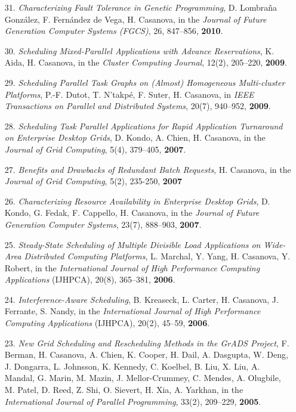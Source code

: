 \begin{enumerate}
\item[31.] {\it Characterizing Fault Tolerance in Genetic Programming}, D. Lombraña González, F. Fernández de Vega, H. Casanova, in the \emph{Journal of Future Generation Computer Systems (FGCS)}, 26, 847--856, {\bf 2010}.

\item[30.] {\it Scheduling Mixed-Parallel Applications with Advance
Reservations}, K. Aida, H. Casanova, in the \emph{Cluster Computing
Journal}, 12(2), 205--220, {\bf 2009}.

\item[29.] {\it Scheduling Parallel Task Graphs on (Almost) Homogeneous
Multi-cluster Platforms}, P.-F. Dutot, T. N'takp\'e, F. Suter, H. Casanova,
in \emph{IEEE Transactions on Parallel and Distributed Systems}, 20(7), 940--952, {\bf 2009}.

\item[28.] {\it Scheduling Task Parallel Applications for Rapid Application Turnaround on Enterprise Desktop Grids}, D. Kondo, A. Chien, H. Casanova,  in the \emph{Journal of Grid Computing}, 5(4), 379--405, {\bf 2007}.

\item[27.] {\it Benefits and Drawbacks of Redundant Batch Requests}, H. Casanova, in the \emph{Journal of Grid Computing}, 5(2), 235-250, {\bf 2007}

\item[26.] {\it Characterizing Resource Availability in Enterprise Desktop
Grids}, D. Kondo, G. Fedak, F. Cappello, H. Casanova, in the \emph{Journal
of Future Generation Computer Systems}, 23(7), 888--903, {\bf 2007}.

\item[25.] {\it Steady-State Scheduling of Multiple Divisible Load
Applications on Wide-Area Distributed Computing Platforms}, L. Marchal, Y.
Yang, H. Casanova, Y. Robert, in the \emph{International Journal
of High Performance Computing Applications} (IJHPCA), 20(8), 365--381,
{\bf 2006}.

\item [24.] {\it Interference-Aware Scheduling}, B. Kreaseck,
L. Carter, H. Casanova, J. Ferrante, S. Nandy, 
in the \emph{International Journal of High Performance Computing
Applications} (IJHPCA), 20(2), 45--59, {\bf 2006}.

\item [23.]
{\it New Grid Scheduling and Rescheduling Methods in the GrADS Project},
F. Berman, H. Casanova, A. Chien, K. Cooper, H. Dail, A. Dasgupta, W. Deng, J. Dongarra, L. Johnsson, K. Kennedy, C. Koelbel, B. Liu, X. Liu, A. Mandal, G. Marin, M. Mazin, J. Mellor-Crummey, C. Mendes, A. Olugbile, M. Patel, D. Reed, Z. Shi, O. Sievert, H. Xia, A. Yarkhan, in the \emph{International Journal of Parallel Programming}, 33(2), 209--229, {\bf 2005}. 


\end{enumerate}
